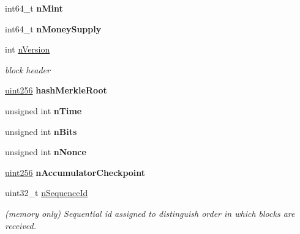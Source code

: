 \begin{DoxyCompactItemize}
int64\+\_\+t {\bfseries n\+Mint}
\item 
\mbox{\label{class_c_block_index_a309fdc44d871b336abe64eadf250cafd}} 
int64\+\_\+t {\bfseries n\+Money\+Supply}
\item 
\mbox{\label{class_c_block_index_a45126301a0a6e26010527a7bbfc1ef58}} 
int \mbox{\hyperlink{class_c_block_index_a45126301a0a6e26010527a7bbfc1ef58}{n\+Version}}
\begin{DoxyCompactList}\small\item\em block header \end{DoxyCompactList}\item 
\mbox{\label{class_c_block_index_a0601b6b2bd6eaedfbc283c00d045a21c}} 
\mbox{\hyperlink{classuint256}{uint256}} {\bfseries hash\+Merkle\+Root}
\item 
\mbox{\label{class_c_block_index_a4b687a226e9e166b0f91c1b616b543a6}} 
unsigned int {\bfseries n\+Time}
\item 
\mbox{\label{class_c_block_index_a3324894e6af612d1bd76f89378435713}} 
unsigned int {\bfseries n\+Bits}
\item 
\mbox{\label{class_c_block_index_a5e0a648ed1df8da171eba636d5ebef01}} 
unsigned int {\bfseries n\+Nonce}
\item 
\mbox{\label{class_c_block_index_a88a596f588bc18689b30238af86fbd97}} 
\mbox{\hyperlink{classuint256}{uint256}} {\bfseries n\+Accumulator\+Checkpoint}
\item 
\mbox{\label{class_c_block_index_a4a679af5f7924cc594b8131371b21e54}} 
uint32\+\_\+t \mbox{\hyperlink{class_c_block_index_a4a679af5f7924cc594b8131371b21e54}{n\+Sequence\+Id}}
\begin{DoxyCompactList}\small\item\em (memory only) Sequential id assigned to distinguish order in which blocks are received. \end{DoxyCompactList}\item 
\mbox{\label{class_c_block_index_a0a25aebf3adf907ea8847e7a108d8225}} 

\end{DoxyCompactItemize}
